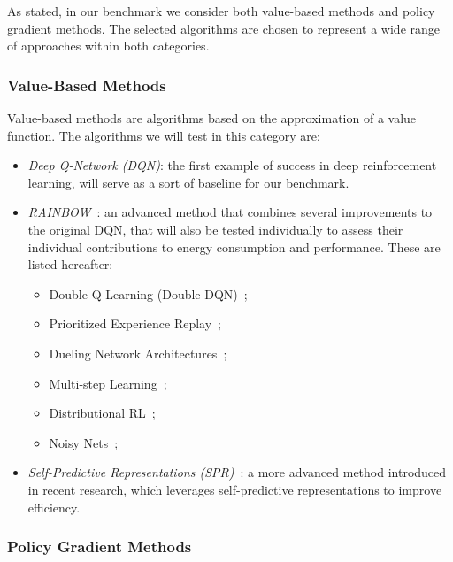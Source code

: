 As stated, in our benchmark we consider both value-based methods and policy gradient methods. The selected algorithms are chosen to represent a wide range of approaches within both categories.

\subsubsection{Value-Based Methods}

Value-based methods are algorithms based on the approximation of a value function. The algorithms we will test in this category are:
\begin{itemize}
	\item \textit{Deep Q-Network (DQN)}: the first example of success in deep reinforcement learning, will serve as a sort of baseline for our benchmark.
	\item \textit{RAINBOW}~\cite{hessel:rainbow}: an advanced method that combines several improvements to the original DQN, that will also be tested individually to assess their individual contributions to energy consumption and performance. These are listed hereafter:
	\begin{itemize}
		\item Double Q-Learning (Double DQN)~\cite{van:double_q};
		\item Prioritized Experience Replay~\cite{schaul:prioritized};
		\item Dueling Network Architectures~\cite{wang:dueling};
		\item Multi-step Learning~\cite{peng:incremental};
		\item Distributional RL~\cite{bellemare:distributional};
		\item Noisy Nets~\cite{fortunato:noisy};
	\end{itemize}
	\item \textit{Self-Predictive Representations (SPR)}~\cite{schwarzer:spr}: a more advanced method introduced in recent research, which leverages self-predictive representations to improve efficiency.
\end{itemize}

\subsubsection{Policy Gradient Methods}

